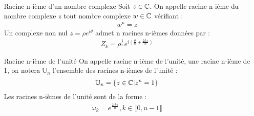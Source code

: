 \begin{definition}{Racine n-ième d'un nombre complexe}
    Soit $z \in \mathbb{C}$. On appelle racine n-ième du nombre complexe $z$ tout nombre complexe $w \in \mathbb{C}$ vérifiant :
    \begin{align*}
        w^n = z
    \end{align*}
    Un complexe non nul $z = \rho e^{i\theta}$ admet n racines n-ièmes données par :
    \begin{align*}
        Z_k = \rho^{\frac{1}{n}} e^{i\left(\frac{\theta}{n} + \frac{2k\pi}{n} \right)} 
    \end{align*}
\end{definition}

\begin{definition}{Racine n-ième de l'unité}
    On appelle racine n-ième de l'unité, une racine n-ième de 1, on notera $\mathbb{U}_n$ l'ensemble des racines n-ièmes de l'unité :
    \begin{align*}
        \mathbb{U}_n = \{z \in \mathbb{C} | z^n = 1 \}
    \end{align*}
    Les racines n-ièmes de l'unité sont de la forme :
    \begin{align*}
        \omega_k = e^{\frac{2ik\pi}{n}}, k \in \llbracket 0, n - 1 \rrbracket
    \end{align*}
\end{definition}


